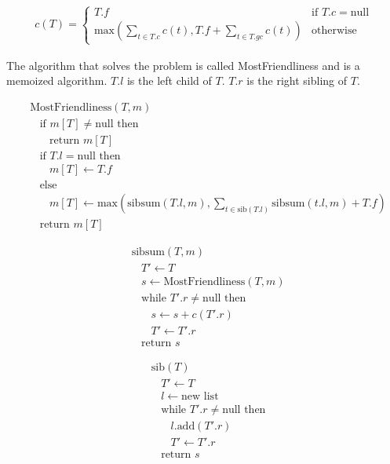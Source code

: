\documentclass[koma,a4paper]{article}
\begin{document}
\begin{align}
  c(T) = \begin{cases}
    T.f &\text{if } T.c = \text{null} \\
    \text{max}\left(\sum\limits_{t \in T.c} c(t), T.f + \sum\limits_{t \in T.\mathit{gc}} c(t)\right) &\text{otherwise}
  \end{cases}
  \label{eq:company_party_recurrence}
\end{align}

The algorithm that solves the problem is called MostFriendliness and is a memoized algorithm. $T.l$ is the left child of $T$. $T.r$ is the right sibling of $T$.

\begin{align*}
  &\text{MostFriendliness}(T, m)\\
  &~~~~\text{if } m[T] \neq \text{null then}\\
  &~~~~~~~~\text{return } m[T]\\
  &~~~~\text{if } T.l = \text{null then}\\
  &~~~~~~~~m[T] \leftarrow T.f\\
  &~~~~\text{else }\\
  &~~~~~~~~m[T] \leftarrow \text{max}\left(\text{sibsum}(T.l, m), \sum\limits_{t \in \text{sib}(T.l)} \text{sibsum}(t.l, m) + T.f \right)\\
  &~~~~\text{return } m[T]
\end{align*}

\begin{align*}
  &\text{sibsum}(T, m)\\
  &~~~~T' \leftarrow T\\
  &~~~~s \leftarrow \text{MostFriendliness}(T, m)\\
  &~~~~\text{while } T'.r \neq \text{null then}\\
  &~~~~~~~~s \leftarrow s + c(T'.r)\\
  &~~~~~~~~T' \leftarrow T'.r\\
  &~~~~\text{return } s
\end{align*}

\begin{align*}
  &\text{sib}(T)\\
  &~~~~T' \leftarrow T\\
  &~~~~l \leftarrow \text{new list}\\
  &~~~~\text{while } T'.r \neq \text{null then}\\
  &~~~~~~~~l.\text{add}(T'.r)\\
  &~~~~~~~~T' \leftarrow T'.r\\
  &~~~~\text{return } s
\end{align*}
\end{document}
